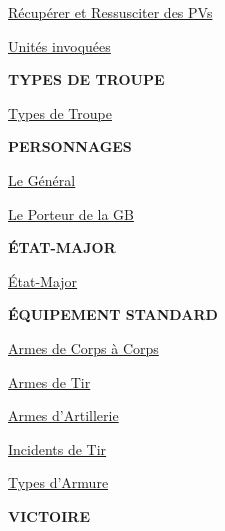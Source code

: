 \begin{framed}
\begin{multicols}{3}
{\hyperlink{recoverandraisewounds}{Récupérer et Ressusciter des PVs}\hfill\pageref{recoverandraisewounds}

\hyperlink{summonedunits}{Unités invoquées}\hfill\pageref{summonedunits}}

\vspace*{\fill}
\columnbreak

\begin{center}\textbf{TYPES DE TROUPE}\end{center}

\vspace*{5pt}
{\setlength\parskip{0pt}
\hyperlink{trooptypes}{Types de Troupe}\hfill\pageref{troop_types}}

\vspace*{5pt}
\begin{center}\textbf{PERSONNAGES}\end{center}

\vspace*{5pt}
{\setlength\parskip{0pt}
\hyperlink{thegeneral}{Le Général}\hfill\pageref{thegeneral}

\hyperlink{thebsb}{Le Porteur de la GB}\hfill\pageref{thebsb}}

\vspace*{5pt}
\begin{center}\textbf{ÉTAT-MAJOR}\end{center}

\vspace*{5pt}
{\setlength\parskip{0pt}
\hyperlink{commandgroup}{État-Major}\hfill\pageref{command_group}}

\vspace*{5pt}
\begin{center}\textbf{ÉQUIPEMENT STANDARD}\end{center}

\vspace*{5pt}
{\setlength\parskip{0pt}
\hyperlink{closecombatweapons}{Armes de Corps à Corps}\hfill\pageref{close_combat_weapons}

\hyperlink{shootingweapons}{Armes de Tir}\hfill\pageref{shooting_weapons}

\hyperlink{artilleryweapons}{Armes d'Artillerie}\hfill\pageref{artillery_weapons}

\hyperlink{themisfiretable}{Incidents de Tir}\hfill\pageref{the_misfire_table}

\hyperlink{armourtypes}{Types d'Armure}\hfill\pageref{armour_types}}

\vspace*{5pt}
\begin{center}\textbf{VICTOIRE}\end{center}


\end{multicols}
\end{framed}

